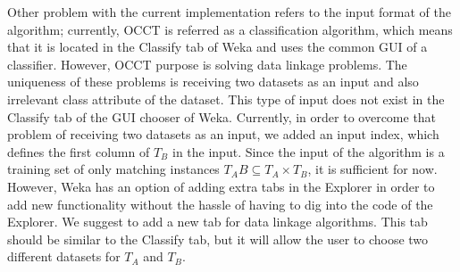 \documentclass[a4paper,12pt]{article}
\begin{document}
\begin{spacing}{1.5}
Other problem with the current implementation refers to the input format of the algorithm; currently, OCCT is referred as a classification algorithm, which means that it is located in the Classify tab of Weka and uses the common GUI of a classifier. However, OCCT purpose is solving data linkage problems. The uniqueness of these problems is receiving two datasets as an input and also irrelevant class attribute of the dataset. This type of input does not exist in the Classify tab of the GUI chooser of Weka. Currently, in order to overcome that problem of receiving two datasets as an input, we added an input index, which defines the first column of $T_B$ in the input. Since the input of the algorithm is a training set of only matching instances $T_AB \subseteq T_A \times T_B$, it is sufficient for now. However, Weka has an option of adding extra tabs in the Explorer in order to add new functionality without the hassle of having to dig into the code of the Explorer. We suggest to add a new tab for data linkage algorithms. This tab should be similar to the Classify tab, but it will allow the user to choose two different datasets for $T_A$ and $T_B$.






\restoregeometry
\end{spacing}
\end{document}
